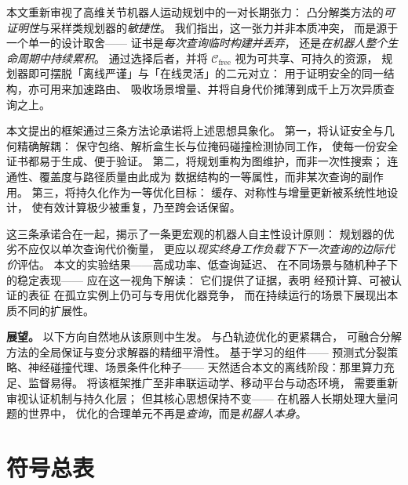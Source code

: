 \documentclass[journal]{IEEEtran}
\newcommand{\Cfree}{\mathcal{C}_{\mathrm{free}}}
\begin{document}
本文重新审视了高维关节机器人运动规划中的一对长期张力：
凸分解类方法的\emph{可证明性}与采样类规划器的\emph{敏捷性}。
我们指出，这一张力并非本质冲突，
而是源于一个单一的设计取舍——
证书是\emph{每次查询临时构建并丢弃}，
还是\emph{在机器人整个生命周期中持续累积}。
通过选择后者，并将 $\Cfree$ 视为可共享、可持久的资源，
规划器即可摆脱「离线严谨」与「在线灵活」的二元对立：
用于证明安全的同一结构，亦可用来加速路由、
吸收场景增量、并将自身代价摊薄到成千上万次异质查询之上。

本文提出的框架通过三条方法论承诺将上述思想具象化。
第一，将认证安全与几何精确解耦：
保守包络、解析盒生长与位掩码碰撞检测协同工作，
使每一份安全证书都易于生成、便于验证。
第二，将规划重构为图维护，而非一次性搜索；
连通性、覆盖度与路径质量由此成为
数据结构的一等属性，而非某次查询的副作用。
第三，将持久化作为一等优化目标：
缓存、对称性与增量更新被系统性地设计，
使有效计算极少被重复，乃至跨会话保留。

这三条承诺合在一起，揭示了一条更宏观的机器人自主性设计原则：
规划器的优劣不应仅以单次查询代价衡量，
更应以\emph{现实终身工作负载下下一次查询的边际代价}评估。
本文的实验结果——高成功率、低查询延迟、
在不同场景与随机种子下的稳定表现——
应在这一视角下解读：
它们提供了证据，表明
经预计算、可被认证的表征
在孤立实例上仍可与专用优化器竞争，
而在持续运行的场景下展现出本质不同的扩展性。

\textbf{展望。}
以下方向自然地从该原则中生发。
与凸轨迹优化的更紧耦合，
可融合分解方法的全局保证与变分求解器的精细平滑性。
基于学习的组件——
预测式分裂策略、神经碰撞代理、场景条件化种子——
天然适合本文的离线阶段：那里算力充足、监督易得。
将该框架推广至非串联运动学、移动平台与动态环境，
需要重新审视认证机制与持久化层；
但其核心思想保持不变——
在机器人长期处理大量问题的世界中，
优化的合理单元不再是\emph{查询}，而是\emph{机器人本身}。

\appendix

\section{符号总表}\label{app:notation}
\end{document}
